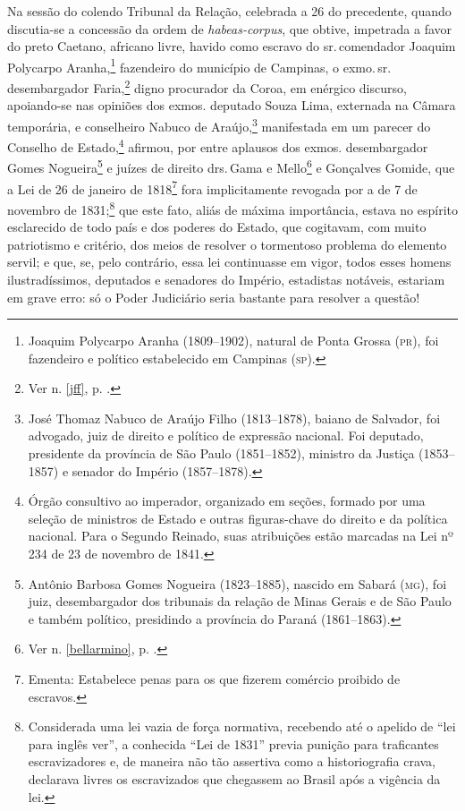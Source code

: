 Na sessão do colendo Tribunal da Relação, celebrada a 26 do precedente,
quando discutia-se a concessão da ordem de \emph{habeas-corpus}, que
obtive, impetrada a favor do preto Caetano, africano livre, havido como
escravo do sr.\,comendador Joaquim Polycarpo Aranha,\footnote{Joaquim \label{aranha}
  Polycarpo Aranha (1809--1902), natural de Ponta Grossa (\textsc{pr}), foi
  fazendeiro e político estabelecido em Campinas (\textsc{sp}).} fazendeiro do
município de Campinas, o exmo.\,sr.\,desembargador Faria,\footnote{Ver n. \ref{jff}, p. \pageref{jff}.} digno procurador da Coroa, em enérgico discurso,
apoiando-se nas opiniões dos exmos. deputado Souza Lima, externada na
Câmara temporária, e conselheiro Nabuco de Araújo,\footnote{José
  Thomaz Nabuco de Araújo Filho (1813--1878), baiano de Salvador, foi
  advogado, juiz de direito e político de expressão nacional. Foi
  deputado, presidente da província de São Paulo (1851--1852), ministro
  da Justiça (1853--1857) e senador do Império (1857--1878).} manifestada
em um parecer do Conselho de Estado,\footnote{Órgão consultivo ao
  imperador, organizado em seções, formado por uma seleção de ministros
  de Estado e outras figuras-chave do direito e da política nacional.
  Para o Segundo Reinado, suas atribuições estão marcadas na Lei nº 234
  de 23 de novembro de 1841.} afirmou, por entre aplausos dos exmos.
desembargador Gomes Nogueira\footnote{Antônio Barbosa Gomes Nogueira
  (1823--1885), nascido em Sabará (\textsc{mg}), foi juiz, desembargador dos
  tribunais da relação de Minas Gerais e de São Paulo e também
  político, presidindo a província do Paraná (1861--1863).} e juízes de
direito drs.\,Gama e Mello\footnote{Ver n. \ref{bellarmino}, p. \pageref{bellarmino}.} e Gonçalves
Gomide, que a Lei de 26 de janeiro de 1818\footnote{Ementa: Estabelece
  penas para os que fizerem comércio proibido de escravos.} fora
implicitamente revogada por a de 7 de novembro de 1831;\footnote{
  Considerada uma lei vazia de força normativa, recebendo até o apelido
  de ``lei para inglês ver'', a conhecida ``Lei de 1831'' previa punição
  para traficantes escravizadores e, de maneira não tão assertiva como a
  historiografia crava, declarava livres os escravizados que chegassem
  ao Brasil após a vigência da lei.} que este fato, aliás de máxima
importância, estava no espírito esclarecido de todo país e dos poderes
do Estado, que cogitavam, com muito patriotismo e critério, dos meios de
resolver o tormentoso problema do elemento servil; e que, se, pelo
contrário, essa lei continuasse em vigor, todos esses homens
ilustradíssimos, deputados e senadores do Império, estadistas notáveis,
estariam em grave erro: só o Poder Judiciário seria bastante para
resolver a questão!

